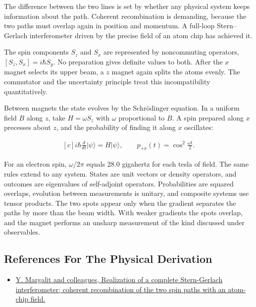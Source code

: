 \documentclass[11pt,oneside]{book}
\newenvironment{centeredalign}{\[\begin{gathered}[c]}{\end{gathered}\]}
\begin{document}
The difference between the two lines is set by whether any physical system keeps information about the path. Coherent recombination is demanding, because the two paths must overlap again in position and momentum. A full-loop Stern--Gerlach interferometer driven by the precise field of an atom chip has achieved it.

The spin components \(S_z\) and \(S_x\) are represented by noncommuting operators, \([S_z,S_x]=i\hbar S_y\). No preparation gives definite values to both. After the \(x\) magnet selects its upper beam, a \(z\) magnet again splits the atoms evenly. The commutator and the uncertainty principle treat this incompatibility quantitatively.

Between magnets the state evolves by the Schrödinger equation. In a uniform field \(B\) along \(z\), take \(H=\omega S_z\) with \(\omega\) proportional to \(B\). A spin prepared along \(x\) precesses about \(z\), and the probability of finding it along \(x\) oscillates:

\begin{centeredalign}
i\hbar\frac{d}{dt}|\psi\rangle=H|\psi\rangle,\qquad
p_{+x}(t)=\cos^2\frac{\omega t}{2}.
\end{centeredalign}

For an electron spin, \(\omega/2\pi\) equals 28.0 gigahertz for each tesla of field. The same rules extend to any system. States are unit vectors or density operators, and outcomes are eigenvalues of self-adjoint operators. Probabilities are squared overlaps, evolution between measurements is unitary, and composite systems use tensor products. The two spots appear only when the gradient separates the paths by more than the beam width. With weaker gradients the spots overlap, and the magnet performs an unsharp measurement of the kind discussed under observables.

\subsection*{References For The Physical Derivation}
\begin{itemize}
\item \href{https://arxiv.org/abs/1801.02708}{Y. Margalit and colleagues, Realization of a complete Stern-Gerlach interferometer; coherent recombination of the two spin paths with an atom-chip field.}
\end{itemize}





\clearpage
\end{document}
